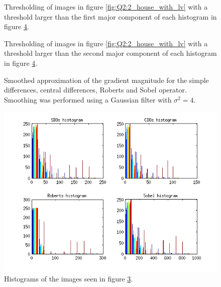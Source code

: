 \begin{figure}[H]
	\centering
	\scalebox{0.9}{}
	\caption{Thresholding of images in figure \ref{fig:Q2:2_house_with_lv} with a threshold larger than the first major component of 
	each histogram in figure \ref{fig:Q2:histogram_house_with_lv}.}
	\label{fig:Q2:threshold_house_1_with_lv}
\end{figure}

\begin{figure}[H]
	\centering
	\scalebox{0.9}{}
	\caption{Thresholding of images in figure \ref{fig:Q2:2_house_with_lv} with a threshold larger than the second major component of 
	each histogram in figure \ref{fig:Q2:histogram_house_with_lv}.}
	\label{fig:Q2:threshold_house_2_with_lv}
\end{figure}


\begin{figure}[H]
	\centering
	\scalebox{0.7}{}
	\caption{Smoothed approximation of the gradient magnitude for the simple differences, central differences, Roberts and Sobel operator. Smoothing
	was performed using a Gaussian filter with $\sigma^2 = 4$.}
	\label{fig:Q2:2_house_smoothed_with_lv}
\end{figure}

\begin{figure}[H]
	\centering
	\includegraphics[scale=0.8]{./images/Q2/with_lv/house_smoothed/histogram_2.png}
	\caption{Histograms of the images seen in figure \ref{fig:Q2:2_house_smoothed_with_lv}.}
	\label{fig:Q2:histogram_house_with_lv}
\end{figure}


